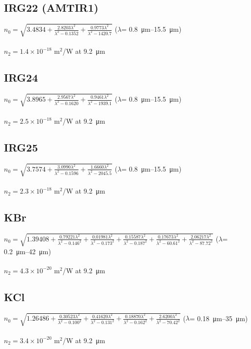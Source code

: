 \subsection*{IRG22 (AMTIR1)}
$n_0=\sqrt{3.4834+\frac{2.8203\lambda^2}{\lambda^2-0.1352}+\frac{0.9773\lambda^2}{\lambda^2-1420.7}}$ (\(\lambda\)= \SIrange{0.8}{15.5}{\micro\meter}) \cite{IRG22}\\
\\
$n_2 = 1.4\times 10^{-18}$ m$^2$/W at \SI{9.2}{\micro\meter} \cite{Polyanskiy-2024}

\subsection*{IRG24}
$n_0=\sqrt{3.8965+\frac{2.9567\lambda^2}{\lambda^2-0.1620}+\frac{0.9461\lambda^2}{\lambda^2-1939.1}}$ (\(\lambda\)= \SIrange{0.8}{15.5}{\micro\meter}) \cite{IRG24}\\
\\
$n_2 = 2.5\times 10^{-18}$ m$^2$/W at \SI{9.2}{\micro\meter} \cite{Polyanskiy-2024}

\subsection*{IRG25}
$n_0=\sqrt{3.7574+\frac{3.0990\lambda^2}{\lambda^2-0.1596}+\frac{1.6660\lambda^2}{\lambda^2-2045.5}}$ (\(\lambda\)= \SIrange{0.8}{15.5}{\micro\meter}) \cite{IRG25}\\
\\
$n_2 = 2.3\times 10^{-18}$ m$^2$/W at \SI{9.2}{\micro\meter} \cite{Polyanskiy-2024}

\subsection*{KBr}
$n_0=\sqrt{1.39408+\frac{0.79221\lambda^2}{\lambda^2-0.146^2}+\frac{0.01981\lambda^2}{\lambda^2-0.173^2}+\frac{0.15587\lambda^2}{\lambda^2-0.187^2}+\frac{0.17673\lambda^2}{\lambda^2-60.61^2}+\frac{2.06217\lambda^2}{\lambda^2-87.72^2}}$ (\(\lambda\)= \SIrange{0.2}{42}{\micro\meter}) \cite{Li-1976}\\
\\
$n_2 = 4.3 \times 10^{-20}$ m$^2$/W at \SI{9.2}{\micro\meter} \cite{Polyanskiy-2024}

\subsection*{KCl}
$n_0=\sqrt{1.26486+\frac{0.30523\lambda^2}{\lambda^2-0.100^2}+\frac{0.41620\lambda^2}{\lambda^2-0.131^2}+\frac{0.18870\lambda^2}{\lambda^2-0.162^2}+\frac{2.6200\lambda^2}{\lambda^2-70.42^2}}$ (\(\lambda\)= \SIrange{0.18}{35}{\micro\meter}) \cite{Li-1976}\\
\\
$n_2 = 3.4 \times 10^{-20}$ m$^2$/W at \SI{9.2}{\micro\meter} \cite{Polyanskiy-2021b}

